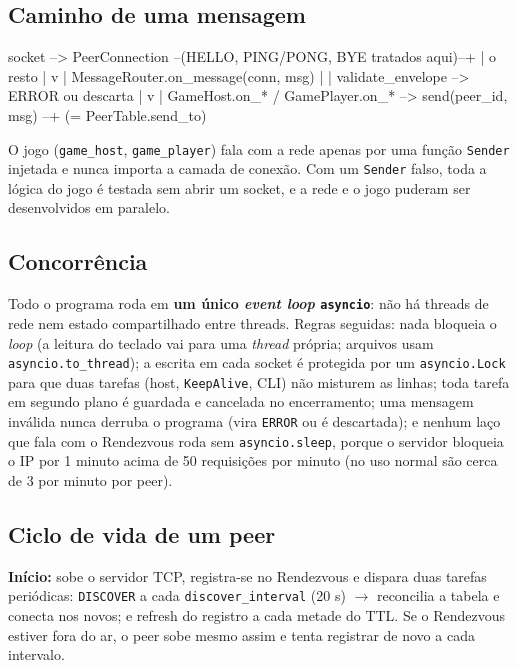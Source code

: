 \documentclass[11pt,a4paper]{article}
\begin{document}
\subsection{Caminho de uma mensagem}
\begin{codigo}
socket --> PeerConnection --(HELLO, PING/PONG, BYE tratados aqui)--+
                |  o resto                                       |
                v                                                |
          MessageRouter.on_message(conn, msg)                    |
                |  validate_envelope --> ERROR ou descarta       |
                v                                                |
     GameHost.on_*  /  GamePlayer.on_*  --> send(peer_id, msg) --+
                                            (= PeerTable.send_to)
\end{codigo}
O jogo (\texttt{game\_host}, \texttt{game\_player}) fala com a rede apenas por uma função \texttt{Sender} injetada e nunca importa a camada de conexão. Com um \texttt{Sender} falso, toda a lógica do jogo é testada sem abrir um socket, e a rede e o jogo puderam ser desenvolvidos em paralelo.

\subsection{Concorrência}
Todo o programa roda em \textbf{um único \emph{event loop} \texttt{asyncio}}: não há threads de rede nem estado compartilhado entre threads. Regras seguidas: nada bloqueia o \emph{loop} (a leitura do teclado vai para uma \emph{thread} própria; arquivos usam \texttt{asyncio.to\_thread}); a escrita em cada socket é protegida por um \texttt{asyncio.Lock} para que duas tarefas (host, \texttt{KeepAlive}, CLI) não misturem as linhas; toda tarefa em segundo plano é guardada e cancelada no encerramento; uma mensagem inválida nunca derruba o programa (vira \texttt{ERROR} ou é descartada); e nenhum laço que fala com o Rendezvous roda sem \texttt{asyncio.sleep}, porque o servidor bloqueia o IP por 1 minuto acima de 50 requisições por minuto (no uso normal são cerca de 3 por minuto por peer).

\subsection{Ciclo de vida de um peer}
\textbf{Início:} sobe o servidor TCP, registra-se no Rendezvous e dispara duas tarefas periódicas: \texttt{DISCOVER} a cada \texttt{discover\_interval} (20 s) $\rightarrow$ reconcilia a tabela e conecta nos novos; e refresh do registro a cada metade do TTL. Se o Rendezvous estiver fora do ar, o peer sobe mesmo assim e tenta registrar de novo a cada intervalo.
\end{document}

